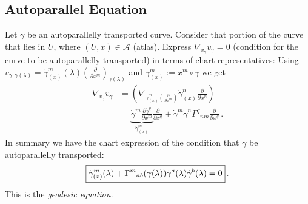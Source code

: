 \documentclass[11pt, a4paper, twocolumn]{article} %
\begin{document}
\subsection{Autoparallel Equation} 
Let $\gamma$ be an autoparallelly transported curve.
Consider that portion of the curve that lies in $U$, where $(U,x)\in \mathcal{A}$ (atlas).
Express $\nabla_{v_\gamma}v_\gamma = 0$ (condition for the curve to be autoparallelly transported)
in terms of chart representatives:
Using $v_{\gamma, \gamma(\lambda)} = \dot{\gamma}^m_{(x)}(\lambda) \left( \frac{\partial}{\partial x^m} \right)_{\gamma(\lambda)}$
and $\gamma^m_{(x)} := x^m \circ \gamma$ we get
\begin{align}
    \nabla_{v_\gamma}v_\gamma  &= \left( \nabla_{\dot{\gamma}^m_{(x)} \left( \frac{\partial}{\partial x^m} \right)} \dot{\gamma}^n_{(x)}  \frac{\partial}{\partial x^n}  \right)\\
    &= \underbrace{\dot{\gamma}^m \frac{\partial \dot{\gamma}^q}{\partial x^m}}_{\ddot{\gamma}^m_{(x)}} \frac{\partial}{\partial x^q} + \dot{\gamma}^m \dot{\gamma}^n \Gamma^q{}_{nm}\frac{\partial}{\partial x^q}\,.
\end{align}
In summary we have the chart expression of the condition that $\gamma$ be autoparallelly transported:
\begin{equation}
    \boxed{%
    \ddot{\gamma}^{m}_{(x)}(\lambda) + \Gamma^m{}_{ab}(\gamma(\lambda)) \dot{\gamma}^a(\lambda)\dot{\gamma}^b(\lambda) = 0}\,.
\end{equation}
This is the \textit{geodesic equation}.
\end{document}
